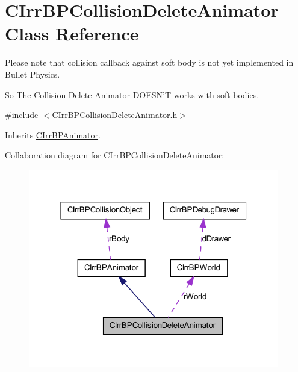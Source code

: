 \hypertarget{class_c_irr_b_p_collision_delete_animator}{
\section{CIrrBPCollisionDeleteAnimator Class Reference}
\label{class_c_irr_b_p_collision_delete_animator}
}


Please note that collision callback against soft body is not yet implemented in Bullet Physics.\par
 So The Collision Delete Animator DOESN'T works with soft bodies.  




{\ttfamily \#include $<$CIrrBPCollisionDeleteAnimator.h$>$}



Inherits \hyperlink{class_c_irr_b_p_animator}{CIrrBPAnimator}.



Collaboration diagram for CIrrBPCollisionDeleteAnimator:\nopagebreak
\begin{figure}[H]
\begin{center}
\leavevmode
\includegraphics[width=310pt]{class_c_irr_b_p_collision_delete_animator__coll__graph}
\end{center}
\end{figure}

